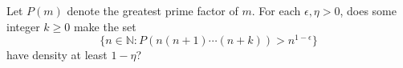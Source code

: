 Let $P(m)$ denote the greatest prime factor of $m$. For each $\epsilon,\eta>0$, does some integer $k\geq0$ make the set
\[\{n\in\mathbb N:P(n(n+1)\cdots(n+k))>n^{1-\epsilon}\}\]
have density at least $1-\eta$?
